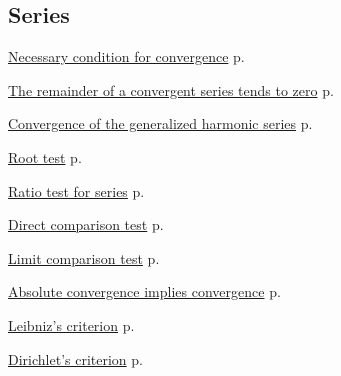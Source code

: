 \documentclass[11pt,a4paper]{article}
\theoremstyle{definition} \newtheorem{definition}{Definition} \theoremstyle{plain} \newtheorem{theorem}{Theorem}
\begin{document}
\subsection*{Series}
\begin{description}
\item \hyperref[thm:necessary-convergence]{Necessary condition for convergence} \dotfill p.~\pageref{thm:necessary-convergence}
\item \hyperref[thm:remainder-zero]{The remainder of a convergent series tends to zero} \dotfill p.~\pageref{thm:remainder-zero}
\item \hyperref[thm:generalized-harmonic]{Convergence of the generalized harmonic series} \dotfill p.~\pageref{thm:generalized-harmonic}
\item \hyperref[thm:root-test]{Root test} \dotfill p.~\pageref{thm:root-test}
\item \hyperref[thm:ratio-test-series]{Ratio test for series} \dotfill p.~\pageref{thm:ratio-test-series}
\item \hyperref[thm:direct-comparison]{Direct comparison test} \dotfill p.~\pageref{thm:direct-comparison}
\item \hyperref[thm:limit-comparison]{Limit comparison test} \dotfill p.~\pageref{thm:limit-comparison}
\item \hyperref[thm:absolute-convergence]{Absolute convergence implies convergence} \dotfill p.~\pageref{thm:absolute-convergence}
\item \hyperref[thm:leibniz]{Leibniz's criterion} \dotfill p.~\pageref{thm:leibniz}
\item \hyperref[thm:dirichlet]{Dirichlet's criterion} \dotfill p.~\pageref{thm:dirichlet}
\end{description}
\end{document}
